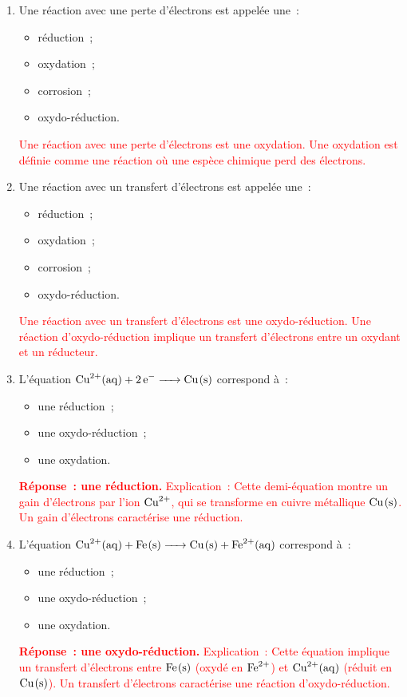 \documentclass[10pt,a4paper]{article}
\newcommand{\correction}[1]{\textcolor{red}{#1}}
\begin{document}
\begin{enumerate}
    \item Une réaction avec une perte d'électrons est appelée une~:
    \begin{itemize}
        \item[$\square$] réduction~;
        \item[$\square$] oxydation~;
        \item[$\square$] corrosion~;
        \item[$\square$] oxydo-réduction.
    \end{itemize}
    \textcolor{red}{Une réaction avec une perte d'électrons est une oxydation.}
    \textcolor{red}{Une oxydation est définie comme une réaction où une espèce chimique perd des électrons.}

    \item Une réaction avec un transfert d'électrons est appelée une~:
    \begin{itemize}
        \item[$\square$] réduction~;
        \item[$\square$] oxydation~;
        \item[$\square$] corrosion~;
        \item[$\square$] oxydo-réduction.
    \end{itemize}
    \textcolor{red}{Une réaction avec un transfert d'électrons est une oxydo-réduction.}
    \textcolor{red}{Une réaction d'oxydo-réduction implique un transfert d'électrons entre un oxydant et un réducteur.}


    \item L'équation $\ce{Cu^{2+}(aq) + 2 e- -> Cu(s)}$ correspond à~:
    \begin{itemize}
        \item[$\square$] une réduction~;
        \item[$\square$] une oxydo-réduction~;
        \item[$\square$] une oxydation.
    \end{itemize}
    \correction{
    \textbf{Réponse~: une réduction.}
    Explication~: Cette demi-équation montre un gain d'électrons par l'ion $\ce{Cu^{2+}}$, qui se transforme en cuivre métallique $\ce{Cu(s)}$. Un gain d'électrons caractérise une réduction.
    }

    \item L'équation $\ce{Cu^{2+}(aq) + Fe(s) -> Cu(s) + Fe^{2+}(aq)}$ correspond à~:
    \begin{itemize}
        \item[$\square$] une réduction~;
        \item[$\square$] une oxydo-réduction~;
        \item[$\square$] une oxydation.
    \end{itemize}
    \correction{
    \textbf{Réponse~: une oxydo-réduction.}
    Explication~: Cette équation implique un transfert d'électrons entre $\ce{Fe(s)}$ (oxydé en $\ce{Fe^{2+}}$) et $\ce{Cu^{2+}(aq)}$ (réduit en $\ce{Cu(s)}$). Un transfert d'électrons caractérise une réaction d'oxydo-réduction.
    }

\end{enumerate}
\end{document}
